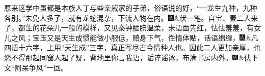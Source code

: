 原来这学中虽都是本族人丁与些亲戚家的子弟，俗语说的好，“一龙生九种，九种各别。”未免人多了，就有龙蛇混杂，下流人物在内。{\includegraphics[width=3mm]{../Images/00005}\includegraphics[width=3mm]{../Images/00012}\footnotesize \kaishu 伏一笔。}自宝、秦二人来了，都生的花朵儿一般的模样，又见秦钟腼腆温柔，未语面先红，怯怯羞羞，有女儿之风；宝玉又是天生成惯能做小服低，赔身下气，性情体贴，话语绵缠，{\includegraphics[width=3mm]{../Images/00005}\includegraphics[width=3mm]{../Images/00012}\footnotesize \kaishu 凡四语十六字，上用“天生成”三字，真正写尽古今情种人也。}因此二人更加亲厚，也怨不得那起同窗人起了疑，背地里你言我语，诟谇谣诼，布满书房内外。{\includegraphics[width=3mm]{../Images/00005}\includegraphics[width=3mm]{../Images/00012}\footnotesize \kaishu 伏下文“阿呆争风”一回。}


